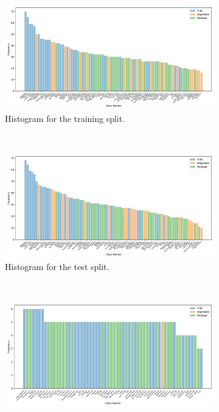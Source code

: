 \begin{figure}[ht!]
	\centering
	\begin{minipage}{0.95\textwidth}
		\centering
		\begin{subfigure}[t]{0.82\linewidth}
			\centering
			\includegraphics[width=\textwidth]{PaperB/appendix/figures/class_distributions_histogram/class_dist_train.png}
			\caption{Histogram for the training split.}
			\label{fig:class_distribution_train}
		\end{subfigure} \\
		\begin{subfigure}[t]{0.82\linewidth}
			\centering
			\includegraphics[width=\textwidth]{PaperB/appendix/figures/class_distributions_histogram/class_dist_test.png}
			\caption{Histogram for the test split.}
			\label{fig:class_distribution_test}
		\end{subfigure} \\
		\begin{subfigure}[t]{0.82\linewidth}
			\centering
			\includegraphics[width=\textwidth]{PaperB/appendix/figures/class_distributions_histogram/class_dist_val.png}

\end{subfigure}
\end{minipage}
\end{figure}
